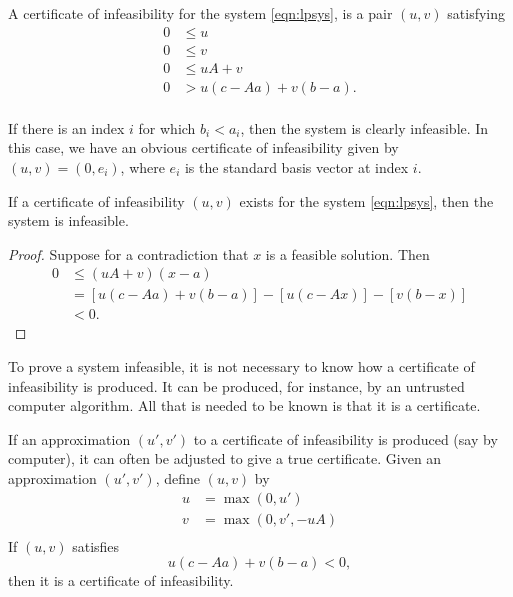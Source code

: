 \begin{definition}
  A certificate of infeasibility for the system \ref{eqn:lpsys},
  is a pair $(u,v)$ satisfying
    $$
    \begin{array}{lll}
    0&\le u\\
    0&\le v\\
    0&\le u A + v\\
    0& > u(c-Aa) + v(b-a). \\
    \end{array}
    $$
\end{definition}

\begin{example}
If there is an index $i$ for which $b_i < a_i$, then the system is
clearly infeasible.  In this case, we have an obvious certificate
of infeasibility given by $(u,v)=(0,e_i)$, where $e_i$ is the
standard basis vector at index $i$.
\end{example}

\begin{lemma}
  If a certificate of infeasibility $(u,v)$ exists for the system
  \ref{eqn:lpsys}, then the system is infeasible.
\end{lemma}

\begin{proof}
    Suppose for a contradiction that $x$ is a feasible solution.
    Then
    $$
    \begin{array}{lll}
    0 &\le (u A + v)(x-a) \\
      &= [u (c- A a) + v (b- a)] - [u (c - A x)] - [v (b - x)]\\
      &< 0.
    \end{array}
    $$
\end{proof}

To prove a system infeasible, it is not necessary to know how a
certificate of infeasibility is produced.  It can be produced, for
instance, by an untrusted computer algorithm.  All that is needed
to be known is that it is a certificate.

If an approximation $(u',v')$ to a certificate of infeasibility is
produced (say by computer), it can often be adjusted to give a
true certificate.  Given an approximation $(u',v')$, define
$(u,v)$ by
    $$
    \begin{array}{lll}
    u &= \max(0,u')\\
    v &= \max(0,v',-u A)\\
    \end{array}
    $$
If $(u,v)$ satisfies
    $$u( c-A a) + v(b-a) <0,$$
then it is a certificate of infeasibility.

